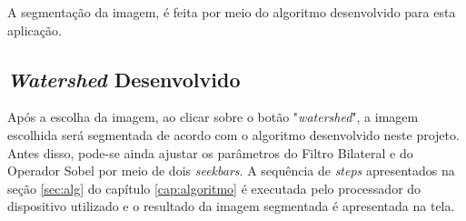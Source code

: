 A segmentação da imagem, é feita por meio do algoritmo desenvolvido para esta aplicação.

\subsection{\textit{Watershed} Desenvolvido}

Após a escolha da imagem, ao clicar sobre o botão "\textit{watershed}", a imagem escolhida será segmentada de acordo com o algoritmo desenvolvido neste projeto. Antes disso, pode-se ainda ajustar os parâmetros do Filtro Bilateral e do Operador Sobel por meio de dois \textit{seekbars}. A sequência de \textit{steps} apresentados na seção \ref{sec:alg} do capítulo \ref{cap:algoritmo} é executada pelo processador do dispositivo utilizado e o resultado da imagem segmentada é apresentada na tela.

